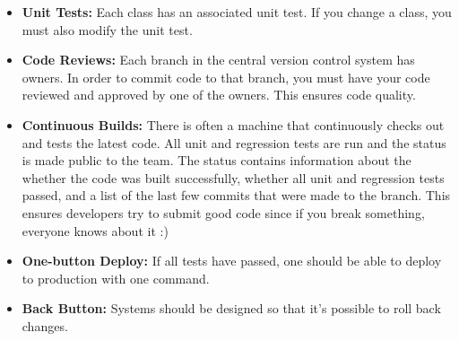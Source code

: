\documentclass[11pt]{article}
\begin{document}
\begin{itemize}

\item \textbf{Unit Tests:} Each class has an associated unit test. If you change a class, you must also modify the unit test.

\item \textbf{Code Reviews:} Each branch in the central version control system has owners. In order to commit code to that branch, you must have your code reviewed and approved by one of the owners. This ensures code quality.

\item \textbf{Continuous Builds:} There is often a machine that continuously checks out and tests the latest code. All unit and regression tests are run and the status is made public to the team. The status contains information about the whether the code was built successfully, whether all unit and regression tests passed, and a list of the last few commits that were made to the branch. This ensures developers try to submit good code since if you break something, everyone knows about it :)

\item \textbf{One-button Deploy:} If all tests have passed, one should be able to deploy to production
with one command.

\item \textbf{Back Button:} Systems should be designed so that it's possible to roll back changes.
\end{itemize}
\end{document}
